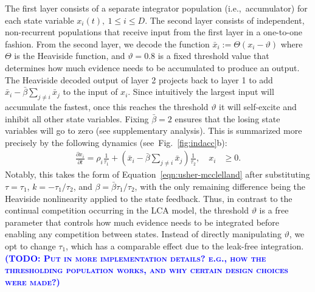 \documentclass[10pt,letterpaper]{article}
\makeatletter
\newcommand{\todo}[1]{\textbf{\textsc{\textcolor{blue}{(TODO\@: #1)}}}}
\makeatother
\begin{document}
The first layer consists of a separate integrator population (i.e.,~accumulator) for each state variable $x_i(t), \ 1 \leq i \leq D$.
The second layer consists of independent, non-recurrent populations that receive input from the first layer in a one-to-one fashion.
From the second layer, we decode the function $\bar{x}_i := \Theta(x_i - \vartheta)$ where $\Theta$ is the Heaviside function, and $\vartheta = 0.8$ is a fixed threshold value that determines how much evidence needs to be accumulated to produce an output.
The Heaviside decoded output of layer 2 projects back to layer 1 to add $\bar{x}_i - \bar{\beta} \sum_{j \neq i} \bar{x}_j$ to the input of $x_i$.
Since intuitively the largest input will accumulate the fastest, once this reaches the threshold $\vartheta$ it will self-excite and inhibit all other state variables.
Fixing $\bar{\beta} = 2$ ensures that the losing state variables will go to zero (see supplementary analysis).
This is summarized more precisely by the following dynamics (see~Fig.~\ref{fig:indacc}b):
\begin{equation}
    \begin{split}
        \frac{{\partial x}_i}{\partial t} = \rho_i \frac{1}{\tau_1} + \left( 
            \bar{x}_i - \bar{\beta} \sum_{j \neq i} \bar{x}_j \right) \frac{1}{\tau_2} , \quad x_i &\ge 0 .
    \end{split}
\end{equation}
Notably, this takes the form of Equation~\ref{eqn:usher-mcclelland} after substituting $\tau = \tau_1$, $k = -\tau_1/\tau_2$, and $\beta = \bar{\beta}\tau_1/\tau_2$, with the only remaining difference being the Heaviside nonlinearity applied to the state feedback.
Thus, in contrast to the continual competition occurring in the LCA model, the threshold $\vartheta$ is a free parameter that controls how much evidence needs to be integrated before enabling any competition between states.
Instead of directly manipulating $\vartheta$, we opt to change $\tau_1$, which has a comparable effect due to the leak-free integration.
\todo{Put in more implementation details? e.g., how the thresholding population works, and why certain design choices were made?}
\end{document}
